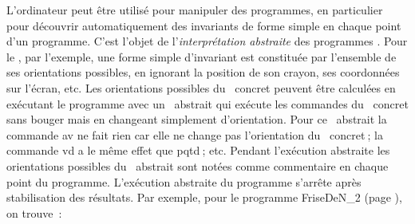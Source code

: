 {\begin{minipage}{\myparboxwidth}
L'ordinateur peut être utilisé pour manipuler des programmes, en
particulier pour découvrir automatiquement des invariants de forme
simple en chaque point d'un programme. C'est l'objet de
l'{\em interprétation abstraite} des programmes
\cite{CousotIA}. Pour le \robot, par l'exemple, une forme simple
d'invariant est constituée par l'ensemble de ses orientations possibles,
en ignorant la position de son crayon, ses coordonnées sur
l'écran, etc. Les orientations possibles du \robot\ concret peuvent être
calculées en exécutant le programme avec un \robot\ abstrait qui
exécute les commandes du \robot\ concret sans bouger
mais en changeant simplement d'orientation. Pour ce \robot\ abstrait
la commande {\idt av} ne fait rien car elle ne change pas l'orientation du
\robot\ concret$\:$; la commande {\idt vd} a le même effet que
{\idt pqtd}$\:$; etc. Pendant l'exécution abstraite les orientations
possibles du \robot\ abstrait sont notées comme commentaire
en chaque point du programme. L'exécution abstraite du programme
s'arrête après stabilisation des résultats. Par exemple, pour le programme {\idt FriseDeN\_2} (page
\pageref{prog:FriseDeN_2}), on trouve~:
\vspace{\abovedisplayskip}
\end{minipage}
}

\noindent {}
